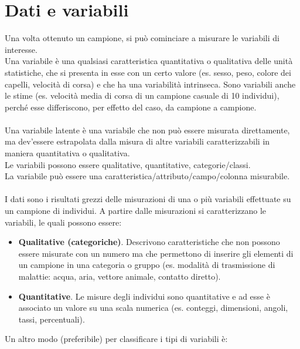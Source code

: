 \documentclass[10pt, draft]{book}
\newcommand{\tightlist}{%
\setlength{\itemsep}{1pt}\setlength{\parskip}{0pt}\setlength{\parsep}{0pt}}
\begin{document}
\section{Dati e variabili}
Una volta ottenuto un campione, si può cominciare a misurare le variabili di interesse.
\\
Una variabile è una qualsiasi caratteristica quantitativa o qualitativa delle unità statistiche, che si presenta in esse con un certo valore (es. sesso, peso, colore dei capelli, velocità di corsa) e che ha una variabilità intrinseca. Sono variabili anche le stime (es. velocità media di corsa di un campione casuale di 10 individui), perché esse differiscono, per effetto del caso, da campione a campione.
\\
\\
Una variabile latente è una variabile che non può essere misurata direttamente, ma dev'essere estrapolata dalla misura di altre variabili caratterizzabili in maniera quantitativa o qualitativa.
\\
Le variabili possono essere qualitative, quantitative, categorie/classi.
\\
La variabile può essere una caratteristica/attributo/campo/colonna misurabile.
\\
\\
I dati sono i risultati grezzi delle misurazioni di una o più variabili effettuate su un campione di individui.
\clearpage
A partire dalle misurazioni si caratterizzano le variabili, le quali possono essere:
\begin{itemize} \tightlist
    \item \textbf{Qualitative (categoriche)}. Descrivono caratteristiche che non possono essere misurate con un numero ma che permettono di inserire gli elementi di un campione in una categoria o gruppo (es. modalità di trasmissione di malattie: acqua, aria, vettore animale, contatto diretto).
    \item \textbf{Quantitative}. Le misure degli individui sono quantitative e ad esse è associato un valore su una scala numerica (es. conteggi, dimensioni, angoli, tassi, percentuali).
\end{itemize}
Un altro modo (preferibile) per classificare i tipi di variabili è:
\end{document}
